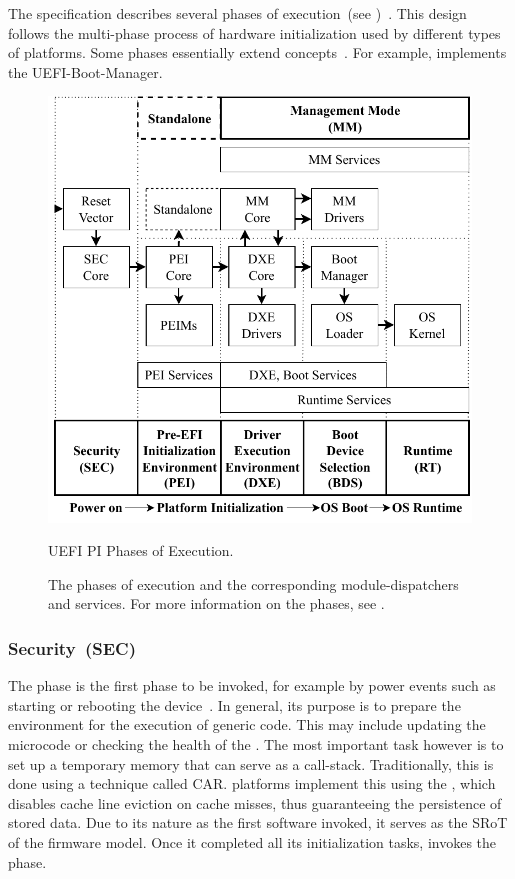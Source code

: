 The  specification describes several phases of execution~(see )~\cite{pi-spec}. This design follows the multi-phase process of hardware initialization used by different types of platforms. Some phases essentially extend  concepts~\cite{pi-spec,uefi-spec}. For example,   implements the \gls{UEFI-Boot-Manager}.

\begin{figure}[htb]
  \centering
  \includegraphics{Figures/UEFIPIPhases.pdf}
  \caption{UEFI PI Phases of Execution.}
  \label{fig:uefi_phases}
  \caption*{The  phases of execution and the corresponding \glspl{module-dispatcher} and services. For more information on the phases, see .}
\end{figure}

\subsubsection{Security~(SEC)}

The  phase is the first phase to be invoked, for example by power events such as starting or rebooting the device~\cite{pi-spec}. In general, its purpose is to prepare the environment for the execution of generic  code. This may include updating the  \gls{microcode} or checking the health of the . The most important task however is to set up a temporary memory that can serve as a \gls{call-stack}. Traditionally, this is done using a technique called \gls{CAR}.  platforms implement this using the , which disables cache line eviction on cache misses, thus guaranteeing the persistence of stored data. Due to its nature as the first software invoked, it serves as the \gls{SRoT} of the  \gls{firmware} model. Once it completed all its initialization tasks,  invokes the  phase.

